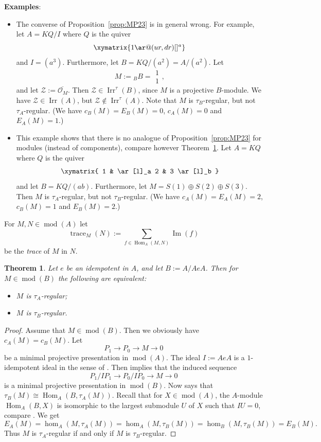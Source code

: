 \documentclass[12pt,reqno]{amsart}
\newtheorem{Thm}{Theorem}[section]
\theoremstyle{definition}
\newcommand{\cO}{{\mathcal O}}
\newcommand{\md}{\operatorname{mod}}
\newcommand{\Hom}{\operatorname{Hom}}
\newcommand{\Ima}{\operatorname{Im}}
\newcommand{\irr}{\operatorname{Irr}}
\newcommand{\bbm}{\begin{matrix}}
\newcommand{\ebm}{\end{matrix}}
\newcommand{\calZ}{\mathcal{Z}}
\DeclareMathOperator{\trace}{trace}
\begin{document}
\noindent
{\bf Examples}:
\begin{itemize}\itemsep2mm

\item[(i)]
The converse of
Proposition~\ref{prop:MP23} is in general wrong.
For example, let $A = KQ/I$ where
$Q$ is the quiver
$$
\xymatrix{1 \ar@(ur,dr)[]^a}
$$
and $I = (a^3)$.
Furthermore, let $B = KQ/(a^2) = A/(a^2)$.
Let
$$
M := {_B}B = \bbm 1\\1 \ebm,
$$
and let $\calZ := \overline{\cO_M}$.
Then $\calZ \in \irr^\tau(B)$, since $M$ is a projective $B$-module.
We have $\calZ \in \irr(A)$, but $\calZ \notin \irr^\tau(A)$.
Note that $M$ is $\tau_B$-regular, but not $\tau_A$-regular.
(We have $c_B(M) = E_B(M) = 0$, $c_A(M) = 0$ and $E_A(M) = 1$.)

\item[(ii)]
This example shows that
there is no analogue of
Proposition~\ref{prop:MP23}
for modules (instead of
components), compare however Theorem~\ref{thm:reduction1}.
Let $A = KQ$ where $Q$ is the quiver
$$
\xymatrix{
1 & \ar[l]_a 2 & 3 \ar[l]_b
}
$$
and let $B = KQ/(ab)$.
Furthermore, let $M = S(1) \oplus S(2) \oplus S(3)$.
Then $M$ is $\tau_A$-regular, but not $\tau_B$-regular.
(We have $c_A(M) = E_A(M) = 2$, $c_B(M) = 1$ and
$E_B(M) = 2$.)

\end{itemize}

For $M,N \in \md(A)$ let
$$
\trace_M(N) := \sum_{f \in \Hom_A(M,N)} \Ima(f)
$$
be the \emph{trace} of $M$ in $N$.


\begin{Thm} \label{thm:reduction1}
Let $e$ be an idempotent in $A$, and let $B := A/AeA$.
Then for $M \in \md(B)$ the following are equivalent:
\begin{itemize}\itemsep2mm

\item[(i)]
$M$ is $\tau_A$-regular;

\item[(ii)]
$M$ is $\tau_B$-regular.

\end{itemize}
\end{Thm}


\begin{proof}
Assume that $M \in \md(B)$.
Then we obviously have $c_A(M) = c_B(M)$.
Let
$$
P_1 \to P_0 \to M \to 0
$$
be a minimal projective presentation
in $\md(A)$.
The ideal $I := AeA$ is a $1$-idempotent ideal in the sense of
\cite[Section~1]{APT92}.
Then \cite[Theorem~1.6]{APT92} implies that the induced sequence
$$
P_1/IP_1 \to P_0/IP_0 \to M \to 0
$$
is a minimal projective presentation in $\md(B)$.
Now \cite[Proposition~4.2]{AR77} says that
$\tau_B(M) \cong \Hom_A(B,\tau_A(M))$.
Recall that for $X \in \md(A)$, the $A$-module
$\Hom_A(B,X)$ is isomorphic to the largest
submodule $U$ of $X$ such that $IU = 0$, compare
\cite[Proof of Lemma~4.1]{AR77}.
We get
$$
E_A(M) = \hom_A(M,\tau_A(M)) = \hom_A(M,\tau_B(M))
= \hom_B(M,\tau_B(M)) = E_B(M).
$$
Thus $M$ is $\tau_A$-regular if and only if $M$ is
$\tau_B$-regular.
\end{proof}
\end{document}
